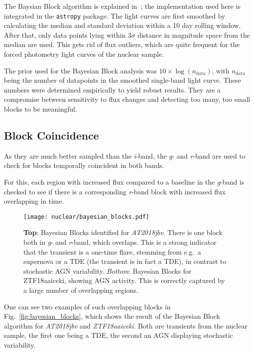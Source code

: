 The Baysian Block algorithm is explained in~; the implementation used here is integrated in the \texttt{astropy} package. The light curves are first smoothed by calculating the median and standard deviation within a 10 day rolling window. After that, only data points lying within $3 \sigma$ distance in magnitude space from the median are used. This gets rid of flux outliers, which are quite frequent for the forced photometry light curves of the nuclear sample.

The prior used for the Bayesian Block analysis was $10 \times \log(n_\text{data})$, with $n_\text{data}$ being the number of datapoints in the smoothed single-band light curve. These numbers were determined empirically to yield robust results. They are a compromise between sensitivity to flux changes and detecting too many, too small blocks to be meaningful.

\subsection{Block Coincidence}
As they are much better sampled than the \textit{i}-band, the \textit{g}- and \textit{r}-band are used to check for blocks temporally coincident in both bands.

For this, each region with increased flux compared to a baseline in the \textit{g}-band is checked to see if there is a corresponding \textit{r}-band block with increased flux overlapping in time.

\begin{figure}
    \texttt{[image: nuclear/bayesian\_blocks.pdf]}
    \caption[Bayesian blocks]{\textbf{Top}: Bayesian Blocks identified for \textit{AT2018jbv}. There is one block both in \textit{g}- and \textit{r}-band, which overlaps. This is a strong indicator that the transient is a one-time flare, stemming from e.g.~a supernova or a TDE (the transient is in fact a TDE), in contrast to stochastic AGN variability. \textit{Bottom}: Bayesian Blocks for ZTF18aaiceki, showing AGN activity. This is correctly captured by a large number of overlapping regions.}
\end{figure}

One can see two examples of such overlapping blocks in Fig.~\ref{fig:bayesian_blocks}, which shows the result of the Bayesian Block algorithm for \textit{AT2018jbv} and \textit{ZTF18aaiceki}. Both are transients from the nuclear sample, the first one being a TDE, the second an AGN displaying stochastic variability.

